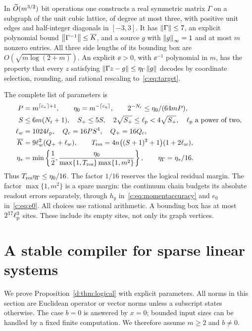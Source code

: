 \begin{lemma}
\label{c:lem:logical}
In $\widetilde O(m^{3/2})$ bit operations one constructs a real symmetric matrix
$\Gamma$ on a subgraph of the unit cubic lattice, of degree at most three,
with positive unit edges and half-integer diagonals in $[-3,3]$.
It has $\left\lVert \Gamma\right\rVert\le7$, an explicit polynomial bound
$\left\lVert \Gamma^{-1}\right\rVert\le \overline K$, and a source $g$ with
$\left\lVert g\right\rVert_\infty=1$ and at most $m$ nonzero entries. All three side lengths
of its bounding box are $O(\sqrt{m\log(2+m)})$.
An explicit $\ee>0$, with $\ee^{-1}$ polynomial in $m$, has the property
that every $z$ satisfying
$\left\lVert \Gamma z-g\right\rVert\le\eta_\Gamma\left\lVert g\right\rVert$ decodes by coordinate selection,
rounding, and rational rescaling to~\eqref{c:eq:target}.

The complete list of parameters is
\begin{align}
 P&=m^{\lceil c_\kappa\rceil+1},\qquad \eta_0=m^{-\lceil c_\eta\rceil},
 \qquad 2^{-N_{\rm r}}\le\eta_0/(64mP),\\
 S&\le6m(N_{\rm r}+1),\quad S_+\le5S,\quad
 2\sqrt{S_+}\le\ell_{\rm p}<4\sqrt{S_+},\quad \ell_{\rm p}\text{ a power of two},\\
 \ell_w&=1024\ell_{\rm p},\quad Q_{\rm c}=16PS^4,\quad Q_+=16Q_{\rm c},\\
 \overline K&=9\ell_w^2(Q_++\ell_w),\qquad
 T_{\rm res}=4n\bigl((S+1)^2+1\bigr)(1+2\ell_w),\notag\\
 \eta_*&=\min\left\{\frac12,
 \frac{\eta_0}{\max\{1,T_{\rm res}\}\max\{1,m^2\}}\right\},
 \qquad \eta_\Gamma=\eta_*/16.                         \label{c:eq:logicalparameters}
\end{align}
Thus $T_{\rm res}\eta_\Gamma\le\eta_0/16$. The factor $1/16$ reserves the
logical residual margin. The factor $\max\{1,m^2\}$ is a spare margin:
the continuum chain budgets its absolute readout errors separately,
through $h_y$ in~\eqref{c:eq:momentaccuracy} and $e_0$
in~\eqref{c:eq:e0}. All choices use rational arithmetic.
A bounding box has at most $2^{17}\ell_{\rm p}^3$ sites. These include its empty
sites, not only its graph vertices.
\end{lemma}

\section{A stable compiler for sparse linear systems}
\label{d:app:logical}

We prove Proposition~\ref{d:thm:logical} with explicit parameters. All
norms in this section are Euclidean operator or vector norms unless a
subscript states otherwise. The case $b=0$ is answered by $x=0$; bounded
input sizes can be handled by a fixed finite computation. We therefore
assume $m\ge2$ and $b\ne0$.

